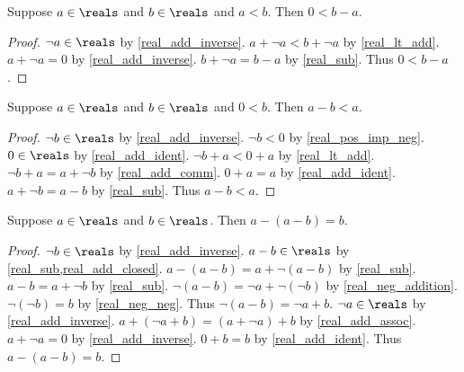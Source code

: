 \begin{lemma}\label{real_lt_imp_pos_diff}
    Suppose $a\in\reals$ and $b\in\reals$ and $a < b$.
    Then $0 < b - a$.
\end{lemma}
\begin{proof}
    $\neg{a}\in\reals$ by \cref{real_add_inverse}.
    $a + \neg{a} < b + \neg{a}$ by \cref{real_lt_add}.
    $a + \neg{a} = 0$ by \cref{real_add_inverse}.
    $b + \neg{a} = b - a$ by \cref{real_sub}.
    Thus $0 < b - a$.
\end{proof}

\begin{lemma}\label{real_sub_pos_lt}
    Suppose $a\in\reals$ and $b\in\reals$ and $0 < b$.
    Then $a - b < a$.
\end{lemma}
\begin{proof}
    $\neg{b}\in\reals$ by \cref{real_add_inverse}.
    $\neg{b} < 0$ by \cref{real_pos_imp_neg}.
    $0\in\reals$ by \cref{real_add_ident}.
    $\neg{b} + a < 0 + a$ by \cref{real_lt_add}.
    $\neg{b} + a = a + \neg{b}$ by \cref{real_add_comm}.
    $0 + a = a$ by \cref{real_add_ident}.
    $a + \neg{b} = a - b$ by \cref{real_sub}.
    Thus $a - b < a$.
\end{proof}

\begin{lemma}\label{real_sub_sub_cancel}
    Suppose $a\in\reals$ and $b\in\reals$.
    Then $a - (a - b) = b$.
\end{lemma}
\begin{proof}
    $\neg{b}\in\reals$ by \cref{real_add_inverse}.
    $a - b\in\reals$ by \cref{real_sub,real_add_closed}.
    $a - (a - b) = a + \neg{(a - b)}$ by \cref{real_sub}.
    $a - b = a + \neg{b}$ by \cref{real_sub}.
    $\neg{(a - b)} = \neg{a} + \neg{(\neg{b})}$ by \cref{real_neg_addition}.
    $\neg{(\neg{b})} = b$ by \cref{real_neg_neg}.
    Thus $\neg{(a - b)} = \neg{a} + b$.
    $\neg{a}\in\reals$ by \cref{real_add_inverse}.
    $a + (\neg{a} + b) = (a + \neg{a}) + b$ by \cref{real_add_assoc}.
    $a + \neg{a} = 0$ by \cref{real_add_inverse}.
    $0 + b = b$ by \cref{real_add_ident}.
    Thus $a - (a - b) = b$.
\end{proof}

